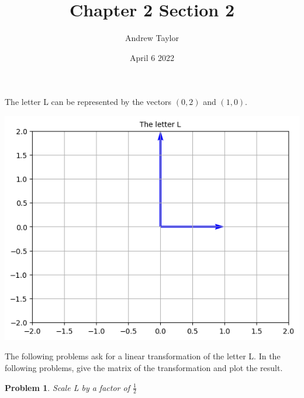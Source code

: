 \documentclass{article}
\title{Chapter 2 Section 2}
\author{Andrew Taylor}
\date{April 6 2022}
\newtheorem{problem}{Problem}
\begin{document}
\maketitle

The letter L can be represented by the vectors $(0, 2)$ and $(1, 0)$. 

\includegraphics[scale=0.5, center]{L} 

The following problems ask for a linear transformation of the letter L. In the following problems, give the matrix of the transformation and plot the result.

\begin{problem}
Scale L by a factor of $\displaystyle \frac{1}{2}$
\end{problem}
\end{document}
